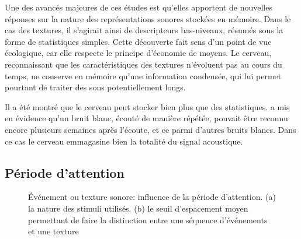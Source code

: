 Une des avancés majeures de ces études est qu'elles apportent de nouvelles réponses sur la nature des représentations sonores stockées en mémoire. Dans le cas des textures, il s'agirait ainsi de descripteurs bas-niveaux, résumés sous la forme de statistiques simples. Cette découverte fait sens d'un point de vue écologique, car elle respecte le principe d'économie de moyens. Le cerveau, reconnaissant que les caractéristiques des textures n'évoluent pas au cours du temps, ne conserve en mémoire qu'une information condensée, qui lui permet pourtant de traiter des sons potentiellement longs. 

Il a été montré que le cerveau peut stocker bien plus que des statistiques. \citep{agus2010rapid} a mis en évidence qu'un bruit blanc, écouté de manière répétée, pouvait être reconnu encore plusieurs semaines après l'écoute, et ce parmi d'autres bruits blancs. Dans ce cas le cerveau emmagasine bien la totalité du signal acoustique.

\subsection{Période d'attention}

\begin{figure}[t]
        \myfloatalign
        \caption[Événement ou texture sonore: influence de la période d'attention]{Événement ou texture sonore: influence de la période d'attention. (a) la nature des stimuli utilisés. (b) le seuil d'espacement moyen permettant de faire la distinction entre une séquence d'événements et une texture}\label{fig:xptexture}
\end{figure}


